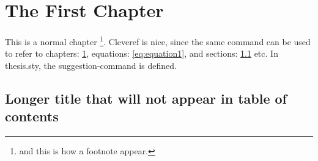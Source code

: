 
  
\chapter{The First Chapter}\label{ch:chapter1}

This is a normal chapter \footnote{and this is how a footnote appear.}. Cleveref is nice, since the same command can be used to refer to chapters: \cref{ch:chapter1}, equations: \cref{eq:equation1}, and sections: \cref{sec:sec1} etc.  In thesis.sty, the suggestion-command is defined.

\section[Short title]{Longer title that will not appear in table of contents}\label{sec:sec1}

\lipsum[1]